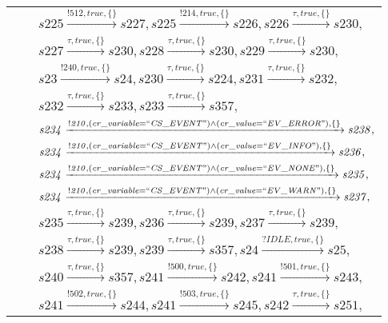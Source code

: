 \begin{tabular}{lcp{350px}}
& & $\mathit{s225}\xrightarrow{\mathit{!512}, \mathit{true}, \{\}}\mathit{s227},\mathit{s225}\xrightarrow{\mathit{!214}, \mathit{true}, \{\}}\mathit{s226},\mathit{s226}\xrightarrow{\mathit{\tau}, \mathit{true}, \{\}}\mathit{s230},$ \\
& & $\mathit{s227}\xrightarrow{\mathit{\tau}, \mathit{true}, \{\}}\mathit{s230},\mathit{s228}\xrightarrow{\mathit{\tau}, \mathit{true}, \{\}}\mathit{s230},\mathit{s229}\xrightarrow{\mathit{\tau}, \mathit{true}, \{\}}\mathit{s230},$ \\
& & $\mathit{s23}\xrightarrow{\mathit{!240}, \mathit{true}, \{\}}\mathit{s24},\mathit{s230}\xrightarrow{\mathit{\tau}, \mathit{true}, \{\}}\mathit{s224},\mathit{s231}\xrightarrow{\mathit{\tau}, \mathit{true}, \{\}}\mathit{s232},$ \\
& & $\mathit{s232}\xrightarrow{\mathit{\tau}, \mathit{true}, \{\}}\mathit{s233},\mathit{s233}\xrightarrow{\mathit{\tau}, \mathit{true}, \{\}}\mathit{s357},$ \\
& & $\mathit{s234}\xrightarrow{\mathit{!210}, \mathit{(cr\_variable = ``CS\_EVENT") \land (cr\_value = ``EV\_ERROR")}, \{\}}\mathit{s238},$ \\
& & $\mathit{s234}\xrightarrow{\mathit{!210}, \mathit{(cr\_variable = ``CS\_EVENT") \land (cr\_value = ``EV\_INFO")}, \{\}}\mathit{s236},$ \\
& & $\mathit{s234}\xrightarrow{\mathit{!210}, \mathit{(cr\_variable = ``CS\_EVENT") \land (cr\_value = ``EV\_NONE")}, \{\}}\mathit{s235},$ \\
& & $\mathit{s234}\xrightarrow{\mathit{!210}, \mathit{(cr\_variable = ``CS\_EVENT") \land (cr\_value = ``EV\_WARN")}, \{\}}\mathit{s237},$ \\
& & $\mathit{s235}\xrightarrow{\mathit{\tau}, \mathit{true}, \{\}}\mathit{s239},\mathit{s236}\xrightarrow{\mathit{\tau}, \mathit{true}, \{\}}\mathit{s239},\mathit{s237}\xrightarrow{\mathit{\tau}, \mathit{true}, \{\}}\mathit{s239},$ \\
& & $\mathit{s238}\xrightarrow{\mathit{\tau}, \mathit{true}, \{\}}\mathit{s239},\mathit{s239}\xrightarrow{\mathit{\tau}, \mathit{true}, \{\}}\mathit{s357},\mathit{s24}\xrightarrow{\mathit{?IDLE}, \mathit{true}, \{\}}\mathit{s25},$ \\
& & $\mathit{s240}\xrightarrow{\mathit{\tau}, \mathit{true}, \{\}}\mathit{s357},\mathit{s241}\xrightarrow{\mathit{!500}, \mathit{true}, \{\}}\mathit{s242},\mathit{s241}\xrightarrow{\mathit{!501}, \mathit{true}, \{\}}\mathit{s243},$ \\
& & $\mathit{s241}\xrightarrow{\mathit{!502}, \mathit{true}, \{\}}\mathit{s244},\mathit{s241}\xrightarrow{\mathit{!503}, \mathit{true}, \{\}}\mathit{s245},\mathit{s242}\xrightarrow{\mathit{\tau}, \mathit{true}, \{\}}\mathit{s251},$ \\

\end{tabular}

